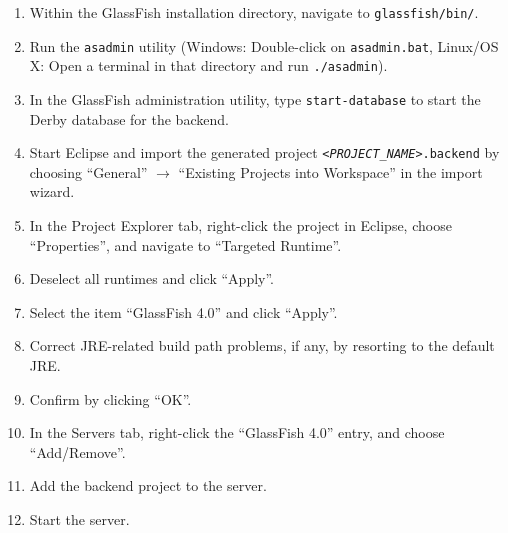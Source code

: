 \begin{enumerate}
\item Within the GlassFish installation directory, navigate to \texttt{glassfish/bin/}.
\item Run the \texttt{asadmin} utility (Windows: Double-click on \texttt{asadmin.bat}, Linux/OS X: Open a terminal in that directory and run \texttt{./asadmin}).
\item In the GlassFish administration utility, type \texttt{start-database} to start the Derby database for the backend.
\item Start Eclipse and import the generated project \texttt{\textit{<PROJECT\_NAME>}.backend} by choosing \enquote{General} $\rightarrow$ \enquote{Existing Projects into Workspace} in the import wizard.
\item In the Project Explorer tab, right-click the project in Eclipse, choose \enquote{Properties}, and navigate to \enquote{Targeted Runtime}.
\item Deselect all runtimes and click \enquote{Apply}.
\item Select the item \enquote{GlassFish 4.0} and click \enquote{Apply}.
\item Correct JRE-related build path problems, if any, by resorting to the default JRE.
\item Confirm by clicking \enquote{OK}.
\item In the Servers tab, right-click the \enquote{GlassFish 4.0} entry, and choose \enquote{Add/Remove}.
\item Add the backend project to the server.
\item Start the server.
\end{enumerate}



